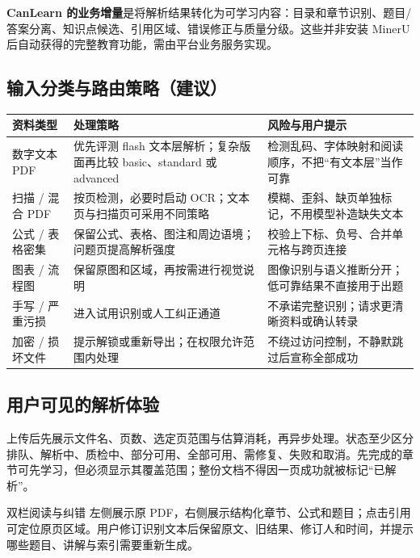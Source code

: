 \documentclass[UTF8,a4paper,11pt,fontset=none]{ctexart}
\newcommand{\cth}[1]{\textbf{\sffamily #1}}
\newcommand{\cont}[1]{\clearpage\noindent{\small\sffamily\color{Muted}#1}\par\vspace{3pt}}
\newenvironment{tbl}{\par\vspace{3pt}\small\noindent\ignorespaces}{\unskip\par\vspace{5pt}}
\begin{document}
\textbf{CanLearn 的业务增量}是将解析结果转化为可学习内容：目录和章节识别、题目/答案分离、知识点候选、引用区域、错误修正与质量分级。这些并非安装 MinerU 后自动获得的完整教育功能，需由平台业务服务实现。

\subsection{输入分类与路由策略（建议）}
\begin{tbl}
\begin{tabularx}{\linewidth}{@{}L{27mm}YY@{}}
\toprule
\cth{资料类型}&\cth{处理策略}&\cth{风险与用户提示}\\\midrule
数字文本 PDF&优先评测 flash 文本层解析；复杂版面再比较 basic、standard 或 advanced&检测乱码、字体映射和阅读顺序，不把“有文本层”当作可靠\\
扫描 / 混合 PDF&按页检测，必要时启动 OCR；文本页与扫描页可采用不同策略&模糊、歪斜、缺页单独标记，不用模型补造缺失文本\\
公式 / 表格密集&保留公式、表格、图注和周边语境；问题页提高解析强度&校验上下标、负号、合并单元格与跨页连接\\
图表 / 流程图&保留原图和区域，再按需进行视觉说明&图像识别与语义推断分开；低可靠结果不直接用于出题\\
手写 / 严重污损&进入试用识别或人工纠正通道&不承诺完整识别；请求更清晰资料或确认转录\\
加密 / 损坏文件&提示解锁或重新导出；在权限允许范围内处理&不绕过访问控制，不静默跳过后宣称全部成功\\
\bottomrule
\end{tabularx}
\end{tbl}

\subsection{用户可见的解析体验}
上传后先展示文件名、页数、选定页范围与估算消耗，再异步处理。状态至少区分排队、解析中、质检中、部分可用、全部可用、需修复、失败和取消。先完成的章节可先学习，但必须显示其覆盖范围；整份文档不得因一页成功就被标记“已解析”。

\begin{insight}{双栏阅读与纠错}
左侧展示原 PDF，右侧展示结构化章节、公式和题目；点击引用可定位原页区域。用户修订识别文本后保留原文、旧结果、修订人和时间，并提示哪些题目、讲解与索引需要重新生成。
\end{insight}

\cont{8 / PDF 解析与内容识别（续）}
\end{document}
